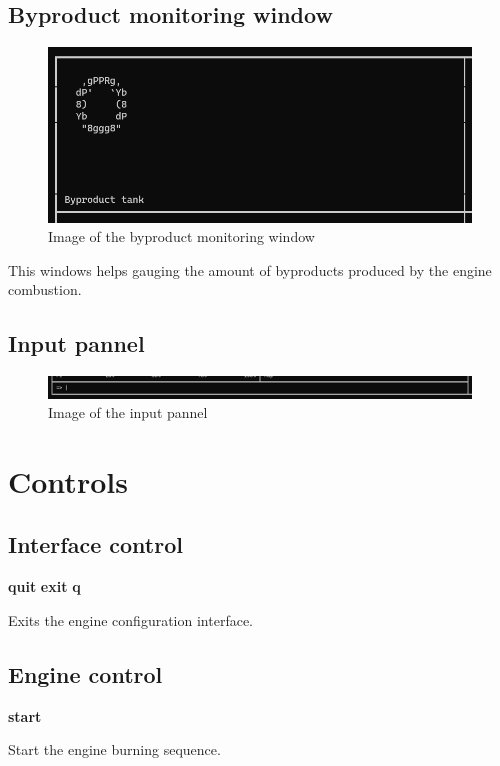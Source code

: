\documentclass[12pt]{article}
\begin{document}
\subsection{Byproduct monitoring window}
\begin{figure}[!htb]
    \center\includegraphics[width=\linewidth]{images/byproduct_tank.png}
    \caption{Image of the byproduct monitoring window}
\end{figure}

This windows helps gauging the amount of byproducts produced by the engine combustion.

\subsection{Input pannel}
\begin{figure}[!htb]
    \center\includegraphics[width=\linewidth]{images/input_pannel.png}
    \caption{Image of the input pannel}
\end{figure}




\newpage
\section{Controls}
\subsection{Interface control}
\begin{tcolorbox}[arc=0mm]
    \textbf{quit}
    \textbf{exit}
    \textbf{q}
\end{tcolorbox}
Exits the engine configuration interface.

\subsection{Engine control}
\begin{tcolorbox}[arc=0mm]
    \textbf{start}
\end{tcolorbox}
Start the engine burning sequence.
\end{document}

